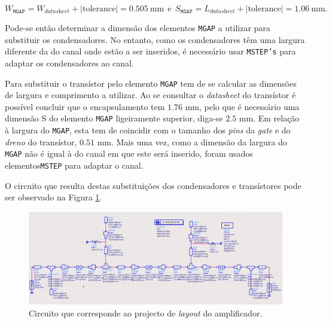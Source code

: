 \documentclass[11pt]{article}
\numberwithin{equation}{section}
\begin{document}
\vspace{-3mm}
\begin{equation}
	W_{\texttt{MGAP}} = W_{\textit{datasheet}} + \lvert\text{tolerance}\rvert = 0.505~\text{mm} ~~ \text{e} ~~ S_{\texttt{MGAP}} = L_{\textit{datasheet}} + \lvert\text{tolerance}\rvert = 1.06~\text{mm}.
	\label{eq:capacitor2}
\end{equation}

\vspace{-1mm}
Pode-se então determinar a dimensão dos elementos \texttt{MGAP} a utilizar para substituir os condensadores. No entanto, como os condensadores têm uma largura diferente da do canal onde estão a ser inseridos, é necessário usar \texttt{MSTEP's} para adaptar os condensadores ao canal.

Para substituir o transístor pelo elemento \texttt{MGAP} tem de se calcular as dimensões de largura e comprimento a utilizar. Ao se consultar o \textit{datasheet} do transístor é possível concluir que o encapsulamento tem $1.76$ mm, pelo que é necessário uma dimensão S do elemento \texttt{MGAP} ligeiramente superior, diga-se $2.5$ mm. Em relação à largura do \texttt{MGAP}, esta tem de coincidir com o tamanho dos \textit{pins} da \textit{gate} e do \textit{dreno} do transístor, $0.51$ mm. Mais uma vez, como a dimensão da largura do \texttt{MGAP} não é igual à do canal em que este será inserido, foram usados elementos\texttt{MSTEP} para adaptar o canal.

O circuito que resulta destas substituições dos condensadores e transístores pode ser observado na Figura \ref{fig:Circuito_layout}.

\begin{figure}[H]
	\centering
	\includegraphics[keepaspectratio=true, scale=0.45]{exps/Circuito_layout}
	\vspace{-0.5em}
	\caption{Circuito que corresponde ao projecto de \textit{layout} do amplificador.}
	\vspace{-0.8em}
	\label{fig:Circuito_layout}
\end{figure}
\end{document}
